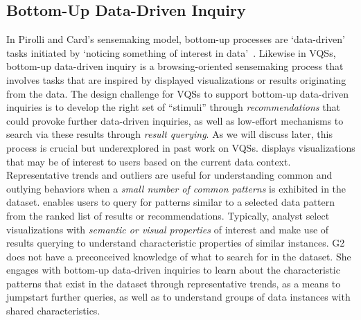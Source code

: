 {  \subsection{Bottom-Up Data-Driven Inquiry}%
  In Pirolli and Card's sensemaking model, bottom-up processes are `data-driven' tasks initiated by `noticing something of interest in data'~\cite{Pirolli}. Likewise in VQSs, bottom-up data-driven inquiry is a browsing-oriented sensemaking process that involves tasks that are inspired by displayed visualizations or results originating from the data. The design challenge for VQSs to support bottom-up data-driven inquiries is to develop the right set of ``stimuli'' through \textit{recommendations} that could provoke further data-driven inquiries, as well as low-effort mechanisms to search via these results through \textit{result querying}. As we will discuss later, this process is crucial but underexplored in past work on VQSs. %
   displays visualizations that may be of interest to users based on the current data context. Representative trends and outliers are useful for understanding common and outlying behaviors when a \emph{small number of common patterns} is exhibited in the dataset. %
   enables users to query for patterns similar to a selected data pattern from the ranked list of results or recommendations. Typically, analyst select visualizations with \emph{semantic or visual properties} of interest and make use of results querying to understand characteristic properties of similar instances.
   G2 does not have a preconceived knowledge of what to search for in the dataset. She engages with bottom-up data-driven inquiries to learn about the characteristic patterns that exist in the dataset through representative trends, as a means to jumpstart further queries, as well as to understand groups of data instances with shared characteristics.
}
